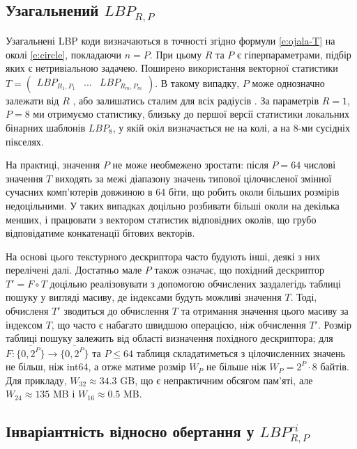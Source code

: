 \subsection{Узагальнений \(LBP_{R,P}\)}\label{section1.1a}\hfill

Узагальнені LBP коди \cite{ojala2002} визначаються в точності згідно формули \ref{e:ojala-T} на околі \ref{e:circle}, покладаючи $n=P$.
При цьому $R$ та $P$ є гіперпараметрами, підбір яких є нетривіальною задачею.
Поширено використання векторної статистики $T = \begin{pmatrix}
    LBP_{R_1,P_1} & ... & LBP_{R_m,P_m}
\end{pmatrix}$. В такому випадку, $P$ може однозначно залежати від $R$ \cite{fastlbp2024}, або залишатись сталим для всіх радіусів \cite{huawudeng2004}.
За параметрів $R=1$, $P=8$ ми отримуємо статистику, близьку до першої версії статистики локальних бінарних шаблонів $LBP_8$, у якій окіл визначається не на колі, а на 8-ми сусідніх пікселях.

На практиці, значення $P$ не може необмежено зростати: після $P=64$ числові значення $T$ виходять за межі діапазону значень типової цілочисленої змінної сучасних комп'ютерів довжиною в 64 біти, 
що робить околи більших розмірів недоцільними. У таких випадках доцільно розбивати більші околи на декілька менших, і працювати з вектором статистик відповідних околів,
що грубо відповідатиме конкатенації бітових векторів. 

На основі цього текстурного дескриптора часто будують інші, деякі з них перелічені далі.
Достатньо мале $P$ також означає, що похідний дескриптор $T' = F \circ T$ доцільно реалізовувати з допомогою обчислених заздалегідь таблиці пошуку у вигляді масиву, 
де індексами будуть можливі значення $T$.
Тоді, обчисленя $T'$ зводиться до обчислення $T$ та отримання значення цього масиву за індексом $T$, що часто є набагато швидшою операцією, ніж обчислення $T'$.
Розмір таблиці пошуку залежить від області визначення похідного дескриптора; 
для $F \colon \{\overline{0,2^P}\} \to \{\overline{0,2^P}\}$ та $P\le 64$ таблиця складатиметься з цілочисленних значень не більш, ніж int64, 
а отже матиме розмір $W_P$ не більше ніж $W_P = 2^P \cdot 8$ байтів. 
Для прикладу, $W_32 \approx 34.3$ GB, що є непрактичним обсягом пам'яті, але $W_24 \approx 135$ MB і $W_16 \approx 0.5$ MB.

\subsection{Інваріантність відносно обертання у \(LBP_{R,P}^{ri}\)}\label{section1.1c}\hfill

